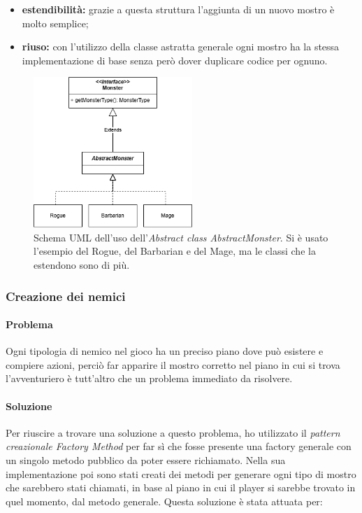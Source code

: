 \documentclass{report}
\begin{document}
\begin{itemize}
    \item \textbf{estendibilità:} grazie a questa struttura l'aggiunta di un nuovo mostro è molto semplice;
    \item \textbf{riuso:} con l'utilizzo della classe astratta generale ogni mostro ha la stessa implementazione di base senza però dover duplicare codice per ognuno.
\end{itemize}

\begin{figure}[H]
    \centering
    \includegraphics[width=6cm]{AbstractMonster.png}
    \caption{Schema UML dell'uso dell'\textit{Abstract class AbstractMonster}. Si è usato l'esempio del Rogue, del Barbarian e del Mage, ma le classi che la estendono sono di più.}
    \label{img:AbstractMonster}
\end{figure}

\subsubsection{Creazione dei nemici}

\paragraph{Problema} Ogni tipologia di nemico nel gioco ha un preciso piano dove può esistere e compiere azioni, perciò far apparire il mostro corretto nel piano in cui si trova l'avventuriero è
%
tutt'altro che un problema immediato da risolvere.

\paragraph{Soluzione} Per riuscire a trovare una soluzione a questo problema, ho utilizzato il \textit{pattern creazionale Factory Method} per far sì che fosse presente una factory generale
%
con un singolo metodo pubblico da poter essere richiamato. Nella sua implementazione poi sono stati creati dei metodi per generare ogni tipo di mostro che sarebbero stati chiamati, in base
%
al piano in cui il player si sarebbe trovato in quel momento, dal metodo generale. Questa soluzione è stata attuata per:
\end{document}
